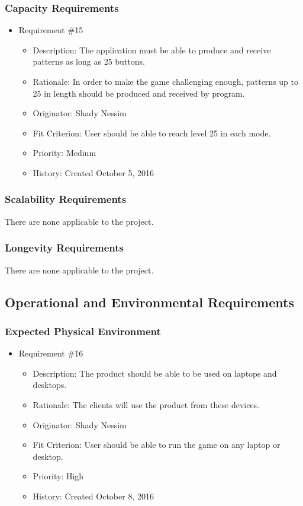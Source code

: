 \documentclass[12pt, titlepage]{article}
\begin{document}
\subsubsection{Capacity Requirements}
\begin{itemize}

\item Requirement \#15 
\begin{itemize} 
\item Description: The application must be able to produce and receive patterns as long as 25 buttons.
\item Rationale: In order to make the game challenging enough, patterns up to 25 in length should be produced and received by program.
\item Originator: Shady Nessim 
\item Fit Criterion: User should be able to reach level 25 in each mode.
\item Priority: Medium 
\item History: Created October 5, 2016
\end{itemize}

\end{itemize}

\subsubsection{Scalability Requirements}
There are none applicable to the project.

\subsubsection{Longevity Requirements}
There are none applicable to the project.

\subsection{Operational and Environmental Requirements}
\subsubsection{Expected Physical Environment}
\begin{itemize}

\item Requirement \#16
\begin{itemize} 
\item Description: The product should be able to be used on laptops and desktops. 
\item Rationale: The clients will use the product from these devices.
\item Originator: Shady Nessim 
\item Fit Criterion: User should be able to run the game on any laptop or desktop.
\item Priority: High 
\item History: Created October 8, 2016
\end{itemize}

\end{itemize}
\end{document}
